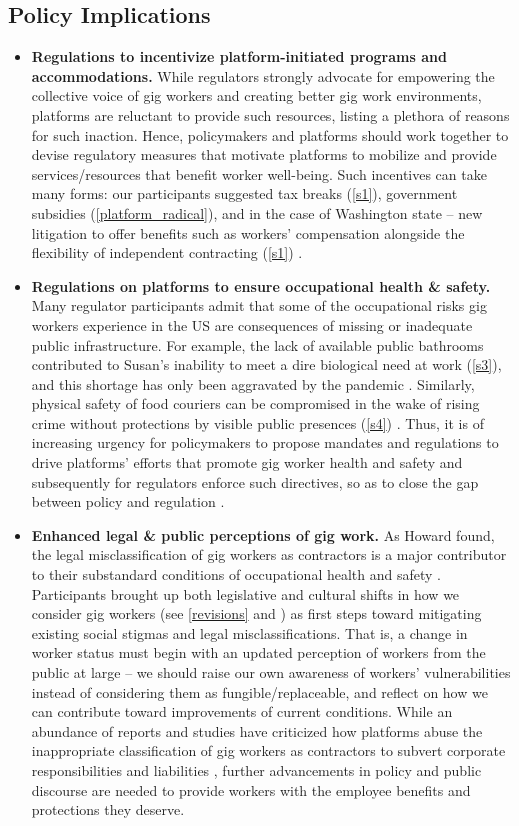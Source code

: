 \subsection{Policy Implications}
\begin{itemize}
    \item \textbf{Regulations to incentivize platform-initiated programs and accommodations.} While regulators strongly advocate for empowering the collective voice of gig workers and creating better gig work environments, platforms are reluctant to provide such resources, listing a plethora of reasons for such inaction.  Hence, policymakers and platforms should work together to devise regulatory measures that motivate platforms to mobilize and provide services/resources that benefit worker well-being. Such incentives can take many forms: our participants suggested tax breaks (\ref{s1}), government subsidies (\ref{platform_radical}), and in the case of Washington state -- new litigation to offer benefits such as workers' compensation alongside the flexibility of independent contracting (\ref{s1}) \cite{noauthor_2022-wo}. 
    \item \textbf{Regulations on platforms to ensure  occupational health \& safety.} Many regulator participants admit that some of the occupational risks gig workers experience in the US are consequences of missing or inadequate public infrastructure. For example, the lack of available public bathrooms contributed to Susan's inability to meet a dire biological need at work (\ref{s3}), and this shortage has only been aggravated by the pandemic \cite{bathroom}. Similarly, physical safety of food couriers can be compromised in the wake of rising crime without protections by visible public presences (\ref{s4}) \cite{assault}. Thus, it is of increasing urgency for policymakers to propose mandates and regulations to drive platforms' efforts that promote gig worker health and safety and subsequently for regulators enforce such directives, so as to close the gap between policy and regulation \cite{fan2022online}.
    \item \textbf{Enhanced legal \& public perceptions of gig work.} As Howard found, the legal misclassification of gig workers as contractors is a major contributor to their substandard conditions of occupational health and safety \cite{Howard2017-wd}. Participants brought up both legislative and cultural shifts in how we consider gig workers (see \ref{revisions}  and ) as first steps toward mitigating existing social stigmas and legal misclassifications. That is, a change in worker status must begin with an updated perception of workers from the public at large -- we should raise our own awareness of workers' vulnerabilities instead of considering them as fungible/replaceable, and reflect on how we can contribute toward improvements of current conditions. While an abundance of reports and studies have criticized how platforms abuse the inappropriate classification of gig workers as contractors to subvert corporate responsibilities and liabilities \cite{lobel2017gig, gray2019ghost, Dubal2017-bj, jit, xMHW, delfino2018work}, further advancements in policy and public discourse are needed to provide workers with the employee benefits and protections they deserve.

\end{itemize}
